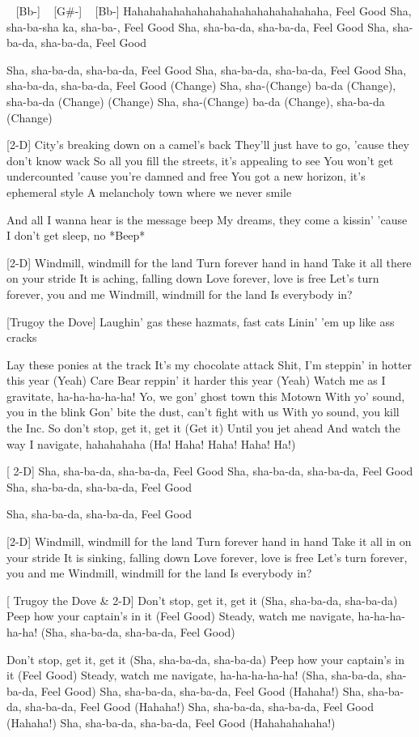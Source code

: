 \begin{guitar}
[Eb-] ~ [Bb-] ~ [G#-] ~ [Bb-]
Hahahahahahahahahahahahahahahahaha, Feel Good
Sha, sha-ba-sha ka, sha-ba-, Feel Good
Sha, sha-ba-da, sha-ba-da, Feel Good
Sha, sha-ba-da, sha-ba-da, Feel Good

Sha, sha-ba-da, sha-ba-da, Feel Good
Sha, sha-ba-da, sha-ba-da, Feel Good
Sha, sha-ba-da, sha-ba-da, Feel Good
(Change) Sha, sha-(Change) ba-da (Change), sha-ba-da (Change)
(Change) Sha, sha-(Change) ba-da (Change), sha-ba-da (Change)

[2-D]
City's breaking down on a camel's back
They'll just have to go, 'cause they don't know wack
So all you fill the streets, it's appealing to see
You won't get undercounted 'cause you're damned and free
You got a new horizon, it's ephemeral style
A melancholy town where we never smile

And all I wanna hear is the message beep
My dreams, they come a kissin' 'cause I don't get sleep, no
*Beep*

[2-D]
Windmill, windmill for the land
Turn forever hand in hand
Take it all there on your stride
It is aching, falling down
Love forever, love is free
Let’s turn forever, you and me
Windmill, windmill for the land
Is everybody in?

[Trugoy the Dove]
Laughin' gas these hazmats, fast cats
Linin' 'em up like ass cracks

Lay these ponies at the track
It's my chocolate attack
Shit, I'm steppin' in hotter this year (Yeah)
Care Bear reppin' it harder this year (Yeah)
Watch me as I gravitate, ha-ha-ha-ha-ha!
Yo, we gon' ghost town this Motown
With yo' sound, you in the blink
Gon' bite the dust, can't fight with us
With yo sound, you kill the Inc.
So don't stop, get it, get it (Get it)
Until you jet ahead
And watch the way I navigate, hahahahaha
(Ha! Haha! Haha! Haha! Ha!)

[ 2-D]
Sha, sha-ba-da, sha-ba-da, Feel Good
Sha, sha-ba-da, sha-ba-da, Feel Good
Sha, sha-ba-da, sha-ba-da, Feel Good

Sha, sha-ba-da, sha-ba-da, Feel Good

[2-D]
Windmill, windmill for the land
Turn forever hand in hand
Take it all in on your stride
It is sinking, falling down
Love forever, love is free
Let's turn forever, you and me
Windmill, windmill for the land
Is everybody in?

[ Trugoy the Dove \& 2-D]
Don't stop, get it, get it (Sha, sha-ba-da, sha-ba-da)
Peep how your captain's in it (Feel Good)
Steady, watch me navigate, ha-ha-ha-ha-ha! (Sha, sha-ba-da, sha-ba-da, Feel Good)

Don't stop, get it, get it (Sha, sha-ba-da, sha-ba-da)
Peep how your captain's in it (Feel Good)
Steady, watch me navigate, ha-ha-ha-ha-ha! (Sha, sha-ba-da, sha-ba-da, Feel Good)
Sha, sha-ba-da, sha-ba-da, Feel Good (Hahaha!)
Sha, sha-ba-da, sha-ba-da, Feel Good (Hahaha!)
Sha, sha-ba-da, sha-ba-da, Feel Good (Hahaha!)
Sha, sha-ba-da, sha-ba-da, Feel Good (Hahahahahaha!) 
\end{guitar}